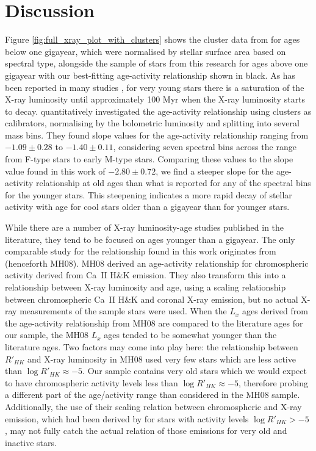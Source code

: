 \section{Discussion}
Figure \ref{fig:full_xray_plot_with_clusters} shows the cluster data from \citet{Jackson_etal_2012} for ages below one gigayear, which were normalised by stellar surface area based on spectral type, alongside the sample of stars from this research for ages above one gigayear with our best-fitting age-activity relationship shown in black. As has been reported in many studies \citep{Vilhu_1984,Jardine_Unruh_1999,Pizzolato_etal_2003}, for very young stars there is a saturation of the X-ray luminosity until approximately 100 Myr when the X-ray luminosity starts to decay. \citet{Jackson_etal_2012} quantitatively investigated the age-activity relationship using clusters as calibrators, normalising by the bolometric luminosity and splitting into several mass bins. They found slope values for the age-activity relationship ranging from $-1.09 \pm 0.28$ to $-1.40 \pm 0.11$, considering seven spectral bins across the range from F-type stars to early M-type stars. Comparing these values to the slope value found in this work of $-2.80 \pm 0.72$, we find a steeper slope for the age-activity relationship at old ages than what is reported for any of the spectral bins for the younger stars. This steepening indicates a more rapid decay of stellar activity with age for cool stars older than a gigayear than for younger stars.

While there are a number of X-ray luminosity-age studies published in the literature, they tend to be focused on ages younger than a gigayear. The only comparable study for the relationship found in this work originates from \citet{Mamajek_Hillenbrand_2008} (henceforth MH08). MH08 derived an age-activity relationship for chromospheric activity derived from Ca~II H\&K emission. They also transform this into a relationship between X-ray luminosity and age, using a scaling relationship between chromospheric Ca~II H\&K and coronal X-ray emission, but no actual X-ray measurements of the sample stars were used. When the $L_{x}$ ages derived from the age-activity relationship from MH08 are compared to the literature ages for our sample, the MH08 $L_{x}$ ages tended to be somewhat younger than the literature ages. Two factors may come into play here: the relationship between $R'_{HK}$ and X-ray luminosity in MH08 used very few stars which are less active than $\log R'_{HK} \approx -5$. Our sample contains very old stars which we would expect to have chromospheric activity levels less than  $\log R'_{HK} \approx -5$, therefore probing a different part of the age/activity range than considered in the MH08 sample. Additionally, the use of their scaling relation between chromospheric and X-ray emission, which had been derived by \citet{Sterzik_Schmitt_1997} for stars with activity levels $\log R'_{HK} > -5$ , may not fully catch the actual relation of those emissions for very old and inactive stars.

